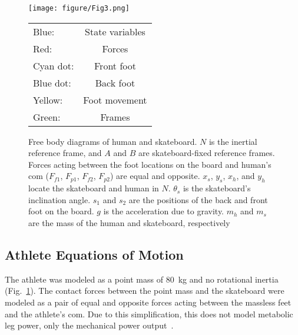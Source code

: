 \documentclass[default,iicol,pdflatex]{sn-jnl}
\begin{document}
\begin{figure}
    \centering
    \texttt{[image: figure/Fig3.png]}
    \footnotesize
  \begin{center}
  \begin{tabular}{l c}
    \toprule
    \color{blue}Blue: & State variables \\
    \color{red} Red: & Forces \\ 
    \color{cyan}Cyan dot: & Front foot \\
    \color{blue}Blue dot: & Back foot \\ 
    \color{yellow}Yellow: & Foot movement \\
    \color{green}Green: & Frames \\
    \bottomrule
    \end{tabular}
    \end{center}
    
    \caption[Free Body Diagram of Phase 1]{Free body diagrams of human and skateboard. $N$ is the inertial reference frame, and $A$ and $B$ are skateboard-fixed reference frames. Forces acting between the foot locations on the board and human's \gls{com} ($F_{f1}$, $F_{p1}$, $F_{f2}$, $F_{p2}$) are equal and opposite. $x_s$, $y_s$, $x_h$, and $y_h$ locate the skateboard and human in $N$. $\theta_s$ is the skateboard's inclination angle. $s_1$ and $s_2$ are the positions of the back and front foot on the board. $g$ is the acceleration due to gravity. $m_h$ and $m_s$ are the mass of the human and skateboard, respectively}
    \label{fig:FBD}
\end{figure}

\subsection{Athlete Equations of Motion}
The athlete was modeled as a point mass of \SI{80}{\kilo\gram} and no rotational inertia (Fig.~\ref{fig:FBD}).
The contact forces between the point mass and the skateboard were modeled as a pair of equal and opposite forces acting between the massless feet and the athlete's \acrfull{com}.
Due to this simplification, this does not model metabolic leg power, only the mechanical power output~\cite{van_der_kruk_power_2018,morin_biomechanics_2018}.
\end{document}
